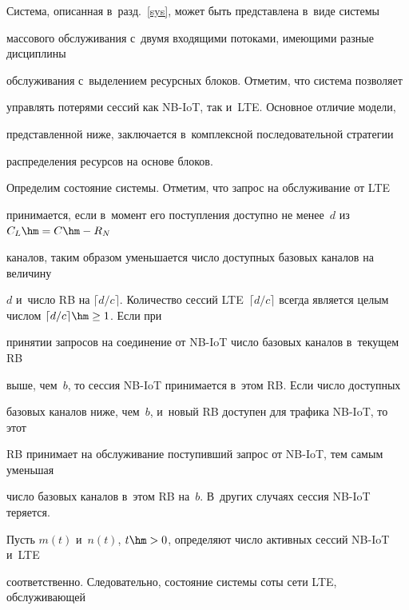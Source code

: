 Система, описанная в~разд.~\ref{sys}, может быть представлена в~виде системы 


массового обслуживания с~двумя входящими потоками, имеющими разные дисциплины 


обслуживания с~выделением ресурсных блоков. Отметим, что система позволяет 


управлять потерями сессий как NB-IoT, так и~LTE. Основное отличие модели, 


представленной ниже, заключается в~комплексной последовательной стратегии 


распределения ресурсов на основе блоков.















Определим состояние системы. Отметим, что запрос на обслуживание от LTE 


принимается, если в~момент его поступления доступно не менее~$d$ из $C_L\hm=C\hm-R_N$ 


каналов, таким образом уменьшается число доступных базовых каналов на величину 


$d$ и~число RB на $\lceil  d/c \rceil$. Количество сессий LTE~$\lceil d/c 


\rceil$ всегда является целым числом $\lceil d/c \rceil \hm\geq 1$. Если при 


принятии запросов на соединение от NB-IoT число базовых каналов в~текущем RB 


выше, чем~$b$, то сессия NB-IoT принимается в~этом RB. Если число доступных 


базовых каналов ниже, чем~$b$, и~новый RB доступен для трафика NB-IoT, то этот 


RB принимает на обслуживание поступивший запрос от NB-IoT, тем самым уменьшая 


число базовых каналов в~этом RB на~$b$. В~других случаях сессия NB-IoT теряется.





Пусть $m(t)$ и~$n(t)$, $t\hm>0$, определяют число активных сессий NB-IoT и~LTE 


соответственно. Следовательно, состояние системы соты сети LTE, обслуживающей 


